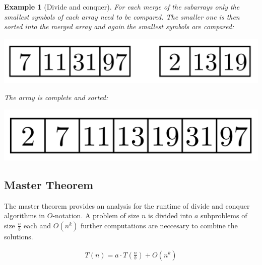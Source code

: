 \documentclass[a4paper, 11pt]{article}
\newtheorem*{example*}{Example}
\begin{document}
\begin{example*}[Divide and conquer]
\newpage
For each merge of the subarrays only the smallest symbols of each array need to be compared. The smaller one is then sorted into the merged array and again the smallest symbols are compared:
\begin{center}
\includegraphics[scale=0.125]{images/merge6.png}
\end{center}

The array is complete and sorted:
\begin{center}
\includegraphics[scale=0.125]{images/merge7.png}
\end{center}


\end{example*}


\subsection{Master Theorem}
\label{Master_Theorem}

The master theorem provides an analysis for the runtime of divide and conquer algorithms in $O$-notation. A problem of size $n$ is divided into $a$ subproblems of size $\frac{n}{b}$ each and $O(n^k)$ further computations are neccesary to combine the solutions. \cite{MT}

\begin{align*}
	T(n)=a \cdot T(\frac{n}{b}) + O(n^k)
\end{align*} 









\pagebreak





\end{document}
